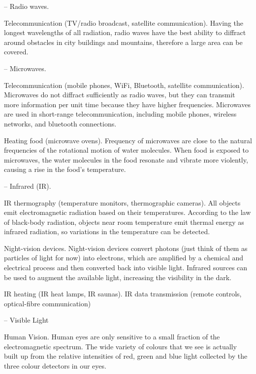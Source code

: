 \begin{compactitem}
	\item[--] Radio waves.
	
	\xskip Telecommunication (TV/radio broadcast, satellite communication). Having the longest wavelengths of all radiation, radio waves have the best ability to diffract around obstacles in city buildings and mountains, therefore a large area can be covered.

	\item[--] Microwaves.
	
	\xskip Telecommunication (mobile phones, WiFi, Bluetooth, satellite communication). Microwaves do not diffract sufficiently as radio waves, but they can transmit more information per unit time because they have higher frequencies. Microwaves are used in short-range telecommunication, including mobile phones, wireless networks, and bluetooth connections.
		
		
	\xskip Heating food (microwave ovens). Frequency of microwaves are close to the natural frequencies of the rotational motion of water molecules. When food is exposed to microwaves, the water molecules in the food resonate and vibrate more violently, causing a rise in the food's temperature.
	
	\item[--] Infrared (IR).
	
	\xskip IR thermography (temperature monitors, thermographic cameras). All objects emit electromagnetic radiation based on their temperatures. According to the law of black-body radiation, objects near room temperature emit thermal energy as infrared radiation, so variations in the temperature can be detected.
	
	\xskip Night-vision devices. Night-vision devices convert photons (just think of them as particles of light for now) into electrons, which are amplified by a chemical and electrical process and then converted back into visible light. Infrared sources can be used to augment the available light, increasing the visibility in the dark.
	
	\xskip IR heating (IR heat lamps, IR saunas). 	
	\xskip IR data transmission (remote controls, optical-fibre communication)	
	\item[--] Visible Light
	
	\xskip Human Vision. Human eyes are only sensitive to a small fraction of the electromagnetic spectrum. The wide variety of colours that we see is actually built up from the relative intensities of red, green and blue light collected by the three colour detectors in our eyes.
	

\end{compactitem}
